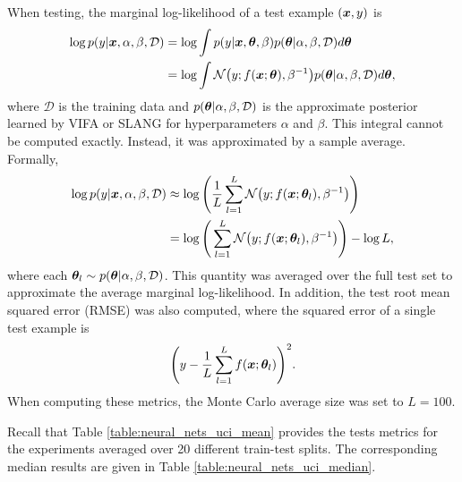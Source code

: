 \documentclass[10pt]{article} %
\begin{document}
When testing, the marginal log-likelihood of a test example $({\bm{x}}, y)$ is
\begin{align}
\begin{split}
	\log p(y | {\bm{x}}, \alpha, \beta, \mathcal{D}) 
	& = \log \int p(y | {\bm{x}}, {\bm{\theta}}, \beta) p({\bm{\theta}} | \alpha, \beta, \mathcal{D}) d{\bm{\theta}} \\
	& = \log \int \mathcal{N}\big(y; f({\bm{x}}; {\bm{\theta}}), \beta^{-1}\big) p({\bm{\theta}} | \alpha, \beta, \mathcal{D}) d{\bm{\theta}},
\end{split}
\end{align}
where $\mathcal{D}$ is the training data and $p({\bm{\theta}} | \alpha, \beta, \mathcal{D})$ is the approximate posterior learned by VIFA or SLANG for hyperparameters $\alpha$ and $\beta$. This integral cannot be computed exactly. Instead, it was approximated by a sample average. Formally, 
\begin{align}
\begin{split}
	\log p(y | {\bm{x}}, \alpha, \beta, \mathcal{D}) 
	& \approx \log \Bigg( \frac{1}{L} \sum_{l=1}^L \mathcal{N}\big(y; f({\bm{x}}; {\bm{\theta}}_l), \beta^{-1}\big) \Bigg) \\
	& = \log \Bigg( \sum_{l=1}^L \mathcal{N}\big(y; f({\bm{x}}; {\bm{\theta}}_l), \beta^{-1}\big) \Bigg) - \log L,
\end{split}
\end{align}
where each ${\bm{\theta}}_l \sim p({\bm{\theta}} | \alpha, \beta, \mathcal{D})$. This quantity was averaged over the full test set to approximate the average marginal log-likelihood. In addition, the test root mean squared error (RMSE) was also computed, where the squared error of a single test example is
\begin{equation}
	\Bigg(y - \frac{1}{L} \sum_{l=1}^L f({\bm{x}}; {\bm{\theta}}_l)\Bigg)^2.
\end{equation}
When computing these metrics, the Monte Carlo average size was set to $L=100$.

Recall that Table \ref{table:neural_nets_uci_mean} provides the tests metrics for the experiments averaged over 20 different train-test splits. The corresponding median results are given in Table \ref{table:neural_nets_uci_median}.
\end{document}
